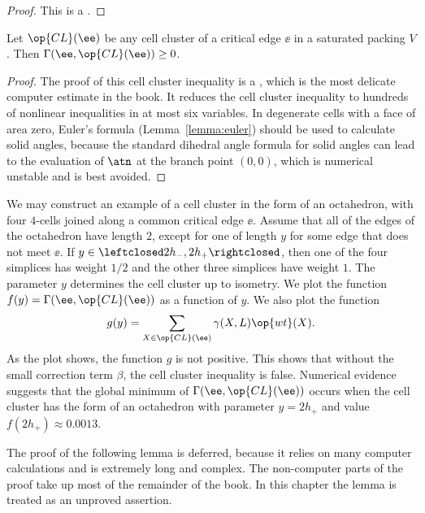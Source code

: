 \begin{proof} This is a .
\end{proof}


\begin{theorem} 
\label{lemma:cluster}
Let $\op{CL}(\ee)$ be any cell cluster of a critical edge $\ee$ in a
saturated packing $V$.  Then $\Gamma(\ee,\op{CL}(\ee))\ge 0$.
\end{theorem}

\begin{proof}
  The proof of this cell cluster inequality is a , which
  is the most delicate computer estimate in the book.  It 
  reduces the cell cluster inequality to hundreds of nonlinear
  inequalities in at most six variables.  In degenerate cells with a
  face of area zero, Euler's formula (Lemma~\ref{lemma:euler}) should
  be used to calculate solid angles, because the standard dihedral angle
  formula for solid angles can lead to the evaluation of $\atn$ at the
  branch point $(0,0)$, which is numerical unstable and is best
  avoided.
\end{proof}

\begin{example}
  We may construct an example of a cell cluster in the form of an
  octahedron, with four $4$-cells joined along a common critical edge
  $\ee$.  Assume that all of the edges of the octahedron have length
  $2$, except for one of length $y$ for some edge that does not meet
  $\ee$.  If $y\in \leftclosed 2 h_-,2 h_+\rightclosed$, then one of
  the four simplices has weight $1/2$ and the other three simplices
  have weight $1$.  The parameter $y$ determines the cell cluster up
  to isometry.  We plot the function $f(y)=\Gamma(\ee,\op{CL}(\ee))$
  as a function of $y$.    We also plot the function
\[
g(y) = \sum_{X\in \op{CL}(\ee)} \gamma(X,L) \op{wt}(X).
\]
As the plot shows, the function $g$ is not positive.  This shows
that without the small correction term $\beta$, the cell cluster
inequality is false.  Numerical evidence suggests that the global
minimum of $\Gamma(\ee,\op{CL}(\ee))$ occurs when the cell cluster has
the form of an octahedron with parameter $y=2h_+$ and value
$f(2h_+)\approx 0.0013$.
\end{example}

\figJXEHXQY %

The proof of the following lemma is deferred, because it relies on
many computer calculations and is extremely long and complex.  The
non-computer parts of the proof take up most of the remainder of the
book.  In this chapter the lemma is treated as an unproved assertion.


